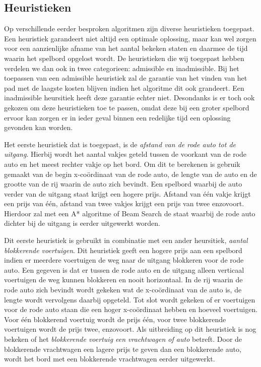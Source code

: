 \documentclass[a4paper]{article}
\begin{document}
\subsection{Heuristieken}
Op verschillende eerder besproken algoritmen zijn diverse heuristieken toegepast. Een heuristiek garandeert niet altijd een optimale oplossing, maar kan wel zorgen voor een aanzienlijke afname van het aantal bekeken staten en daarmee de tijd waarin het spelbord opgelost wordt. De heuristieken die wij toegepast hebben verdelen we dan ook in twee categorieen: admissible en inadmissible. Bij het toepassen van een admissible heuristiek zal de garantie van het vinden van het pad met de laagste kosten blijven indien het algoritme dit ook grandeert. Een inadmissible heursitiek heeft deze garantie echter niet. Desondanks is er toch ook gekozen om deze heuristieken toe te passen, omdat deze bij een groter spelbord ervoor kan zorgen er in ieder geval binnen een redelijke tijd een oplossing gevonden kan worden.
	
    Het eerste heuristiek dat is toegepast, is de \textit{afstand van de rode auto tot de uitgang}. Hierbij wordt het aantal vakjes geteld tussen de voorkant van de rode auto en het meest rechter vakje op het bord. Om dit te berekenen is gebruik gemaakt van de begin x-coördinaat van de rode auto, de lengte van de auto en de grootte van de rij waarin de auto zich bevindt. Een spelbord waarbij de auto verder van de uitgang staat krijgt een hogere prijs. Afstand van één vakje krijgt een prijs van één, afstand van twee vakjes krijgt een prijs van twee enzovoort. Hierdoor zal met een A* algoritme of Beam Search de staat waarbij de rode auto dichter bij de uitgang is eerder uitgewerkt worden. 

	Dit eerste heuristiek is gebruikt in combinatie met een ander heursitiek, \textit{aantal blokkerende voertuigen}. Dit heuristiek geeft een hogere prijs aan een spelbord indien er meerdere voertuigen de weg naar de uitgang blokkeren voor de rode auto. Een gegeven is dat er tussen de rode auto en de uitgang alleen verticaal voertuigen de weg kunnen blokkeren en nooit horizontaal. In de rij waarin de rode auto zich bevindt wordt gekeken wat de x-coördinaat van de auto is, de lengte wordt vervolgens daarbij opgeteld. Tot slot wordt gekeken of er voertuigen voor de rode auto staan die een hoger x-coördinaat hebben en hoeveel voertuigen. Voor één blokkerend voertuig wordt de prijs één, voor twee blokkerende voertuigen wordt de prijs twee, enzovoort. Als uitbreiding op dit heuristiek is nog bekeken of het \textit{blokkerende voertuig een vrachtwagen of auto} betreft. Door de blokkerende vrachtwagen een lagere prijs te geven dan een blokkerende auto, wordt het bord met een blokkerende vrachtwagen eerder uitgewerkt. 
    
\end{document}
